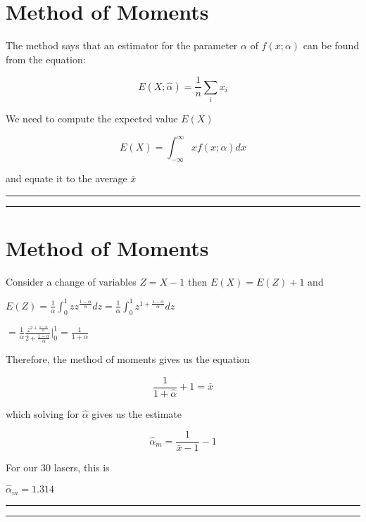 \documentclass[
]{book}
\begin{document}
\hypertarget{method-of-moments-8}{%
\section{Method of Moments}\label{method-of-moments-8}}

The method says that an estimator for the parameter \(\alpha\) of \(f(x;\alpha)\) can be found from the equation:

\[E(X; \hat{\alpha})=\frac{1}{n}\sum_i x_i\]

We need to compute the expected value \(E(X)\)

\[E(X)=\int_{-\infty}^{\infty} x f(x;\alpha)dx\]

and equate it to the average \(\bar{x}\)

\begin{center}\rule{0.5\linewidth}{0.5pt}\end{center}

\begin{center}\rule{0.5\linewidth}{0.5pt}\end{center}

\hypertarget{method-of-moments-9}{%
\section{Method of Moments}\label{method-of-moments-9}}

Consider a change of variables \(Z=X-1\) then \(E(X)=E(Z)+1\) and

\(E(Z)= \frac{1}{\alpha} \int_0^1 z z^{\frac{1-\alpha}{\alpha}}dz= \frac{1}{\alpha} \int_0^1 z^{1+\frac{1-\alpha}{\alpha}}dz\)

\(= \frac{1}{\alpha} \frac{z^{2+\frac{1-\alpha}{\alpha}}}{{2+\frac{1-\alpha}{\alpha}}} |_0^1=\frac{1}{1+\alpha}\)

Therefore, the method of moments gives us the equation

\[\frac{1}{1+\hat{\alpha}}+1=\bar{x}\]

which solving for \(\hat{\alpha}\) gives us the estimate

\[\hat{\alpha}_m=\frac{1}{\bar{x}-1}-1\]

For our 30 lasers, this is

\(\hat{\alpha}_m=1.314\)

\begin{center}\rule{0.5\linewidth}{0.5pt}\end{center}

\begin{center}\rule{0.5\linewidth}{0.5pt}\end{center}
\end{document}
